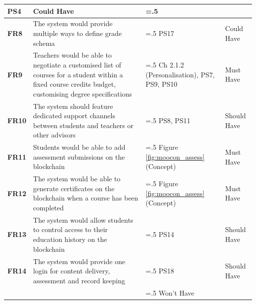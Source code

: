 \begin{table}[!h]
\begin{tabularx}{\textwidth}{>{\bfseries}l>{\hsize=1.5\hsize}X>{\hsize=.5\hsize}Xl}
		PS4                                                       & Could Have
		\\\midrule
		FR8                                                       & The system would provide multiple ways to define grade schema                     & PS17
		                                                          & Could Have
		\\\midrule
		FR9                                                       & Teachers would be able to negotiate a customised list of courses for a student
		within a fixed course credits budget, customising degree specifications
		                                                          & Ch 2.1.2 (Personalisation), PS7, PS9, PS10                                              & Must Have
		\\\midrule
		FR10                                                      & The system should feature dedicated support channels between students and teachers
		or other advisors
		                                                          & PS8, PS11                                                                         & Should Have
		\\\midrule
		FR11                                                      & Students would be able to add assessment submissions on the blockchain
		                                                          & Figure \ref{fig:moocon_assess} (Concept)                                          & Must Have
		\\\midrule
		FR12                                                      & The system would be able to generate certificates on the blockchain when a course
		has been completed                                        & Figure \ref{fig:moocon_assess} (Concept)                                          & Must Have
		\\\midrule
		FR13                                                      & The system would allow students to control access to their education history
		on the blockchain                                         & PS14                                                                              & Should Have
		\\\midrule
		FR14                                                      & The system would provide one login for content delivery, assessment and
		record keeping                                            & PS18                                                                              & Should Have
		\\\midrule
		                                                          & \multicolumn{2}{c}{Requirements targetting PS6, PS13, PS16}                 & Won't Have
		\\\bottomrule
	\end{tabularx}
\end{table}

